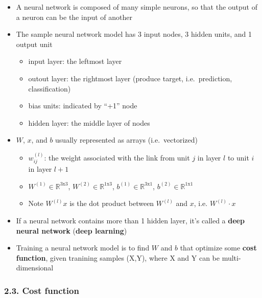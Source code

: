 \documentclass[11pt]{article}
\providecommand{\tightlist}{%
      \setlength{\itemsep}{0pt}\setlength{\parskip}{0pt}}
\begin{document}
\begin{itemize}
\tightlist
\item
  A neural network is composed of many simple neurons, so that the
  output of a neuron can be the input of another
\item
  The sample neural network model has 3 input nodes, 3 hidden units, and
  1 output unit

  \begin{itemize}
  \tightlist
  \item
    input layer: the leftmost layer
  \item
    outout layer: the rightmost layer (produce target, i.e.~prediction,
    classification)
  \item
    bias units: indicated by ``+1'' node
  \item
    hidden layer: the middle layer of nodes 
  \end{itemize}
\item
  \(W\), \(x\), and \(b\) usually represented as arrays
  (i.e.~vectorized)

  \begin{itemize}
  \tightlist
  \item
    \(w_{ij}^{(l)}\): the weight associated with the link from unit
    \(j\) in layer \(l\) to unit \(i\) in layer \(l+1\)
  \item
    \(W^{(1)} \in \mathbb{R}^{3\text{x}3}\),
    \(W^{(2)} \in \mathbb{R}^{1\text{x}3}\),
    \(b^{(1)} \in \mathbb{R}^{3\text{x}1}\),
    \(b^{(2)} \in \mathbb{R}^{1\text{x}1}\)
  \item
    Note \(W^{(l)}x\) is the dot product between \(W^{(l)}\) and \(x\),
    i.e. \(W^{(l)} \cdot x\)
  \end{itemize}
\item
  If a neural network contains more than 1 hidden layer, it's called a
  \textbf{deep neural network} (\textbf{deep learning})
\item
  Training a neural network model is to find \(W\) and \(b\) that
  optimize some \textbf{cost function}, given tranining samples (X,Y),
  where X and Y can be multi-dimensional
\end{itemize}

    \hypertarget{cost-function}{%
\subsubsection{2.3. Cost function}\label{cost-function}}
\end{document}
